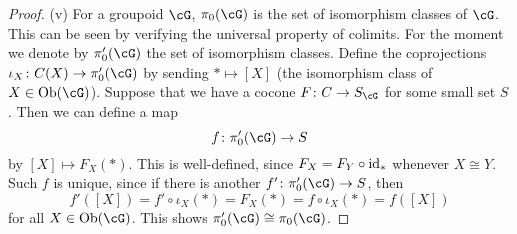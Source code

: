 \documentclass[a4paper,11pt,openany]{scrartcl}
\begin{document}
\begin{proof}
(v) For a groupoid $\cG$, $\pi_0(\cG)$ is the set of isomorphism classes of $\cG$. This can be seen by verifying the universal property of colimits. For the moment we denote by $\pi'_0(\cG)$ the set of isomorphism classes. Define the coprojections $\iota_X\colon C(X)\to\pi_0'(\cG)$ by sending $*\mapsto[X]$ (the isomorphism class of $X\in\Ob(\cG)$). Suppose that we have a cocone $F\colon C\to S_\cG$ for some small set $S$. Then we can define a map
\[
f\colon\pi'_0(\cG)\to S
\]
by $[X]\mapsto F_X(*)$. This is well-defined, since $F_X=F_Y\circ\operatorname{id}_*$ whenever $X\cong Y$. Such $f$ is unique, since if there is another $f'\colon\pi_0'(\cG)\to S$, then 
\[
f'([X])=f'\circ \iota_X(*)=F_X(*)=f\circ\iota_X(*)=f([X])
\]
for all $X\in\Ob(\cG)$. This shows $\pi_0'(\cG)\cong\pi_0(\cG)$.
\end{proof}
\end{document}
